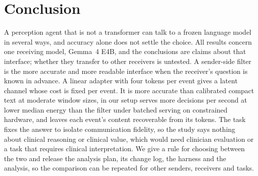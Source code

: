 \section{Conclusion}
\label{sec:conclusion}
A perception agent that is not a transformer can talk to a frozen language model in several ways, and accuracy alone does not settle the choice. All results concern one receiving model, Gemma~4 E4B, and the conclusions are claims about that interface; whether they transfer to other receivers is untested. A sender-side filter is the more accurate and more readable interface when the receiver's question is known in advance. A linear adapter with four tokens per event gives a latent channel whose cost is fixed per event. It is more accurate than calibrated compact text at moderate window sizes, in our setup serves more decisions per second at lower median energy than the filter under batched serving on constrained hardware, and leaves each event's content recoverable from its tokens. The task fixes the answer to isolate communication fidelity, so the study says nothing about clinical reasoning or clinical value, which would need clinician evaluation or a task that requires clinical interpretation. We give a rule for choosing between the two and release the analysis plan, its change log, the harness and the analysis, so the comparison can be repeated for other senders, receivers and tasks.
